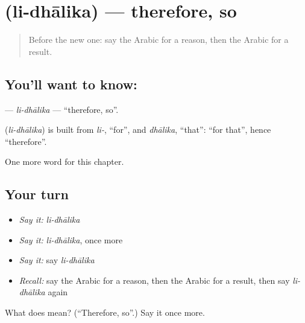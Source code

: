 \section[\texorpdfstring{\ar{لذلك} (li-dhālika)}{لذلك (li-dhālika)}]{ (li-dhālika) — therefore, so}

\label{lesson:AR-C174-li-dhalika}



\begin{quote}
Before the new one: say the Arabic for a reason, then the Arabic for a result.
\end{quote}

\subsection*{You'll want to know: }
\textbf{} — \emph{li-dhālika} — \textquotedblleft{}therefore, so\textquotedblright{}.

\begin{cousinweb}
\textbf{} (\emph{li-dhālika}) is built from \emph{li-}, \textquotedblleft{}for\textquotedblright{}, and \emph{dhālika}, \textquotedblleft{}that\textquotedblright{}: \textquotedblleft{}for that\textquotedblright{}, hence \textquotedblleft{}therefore\textquotedblright{}.
\end{cousinweb}

\begin{grammarlens}[title={What you've built}]
One more word for this chapter.
\end{grammarlens}

\subsection*{Your turn}
\begin{itemize}
\raggedright
  \item \emph{Say it:} \emph{li-dhālika}
  \item \emph{Say it:} \emph{li-dhālika}, once more
  \item \emph{Say it:} say \emph{li-dhālika}
  \item \emph{Recall:} say the Arabic for a reason, then the Arabic for a result, then say \emph{li-dhālika} again
\end{itemize}

\begin{tcolorbox}[breakable,colback=teal!4,colframe=teal!35!black,title={Before you move on}]
What does  mean? (\textquotedblleft{}Therefore, so\textquotedblright{}.) Say it once more.
\end{tcolorbox}

